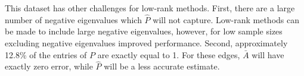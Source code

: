 \documentclass[journal,twoside,web]{ieeecolor}
\begin{document}


This dataset has other challenges for low-rank methods.
First, there are a large number of negative eigenvalues which $\hat{P}$ will not capture.
Low-rank methods can be made to include large negative eigenvalues, however, for low sample sizes excluding negative eigenvalues improved performance.
Second, approximately 12.8\% of the entries of $P$ are exactly equal to 1.
For these edges, $\bar{A}$ will have exactly zero error, while $\hat{P}$ will be a less accurate estimate.



\end{document}
